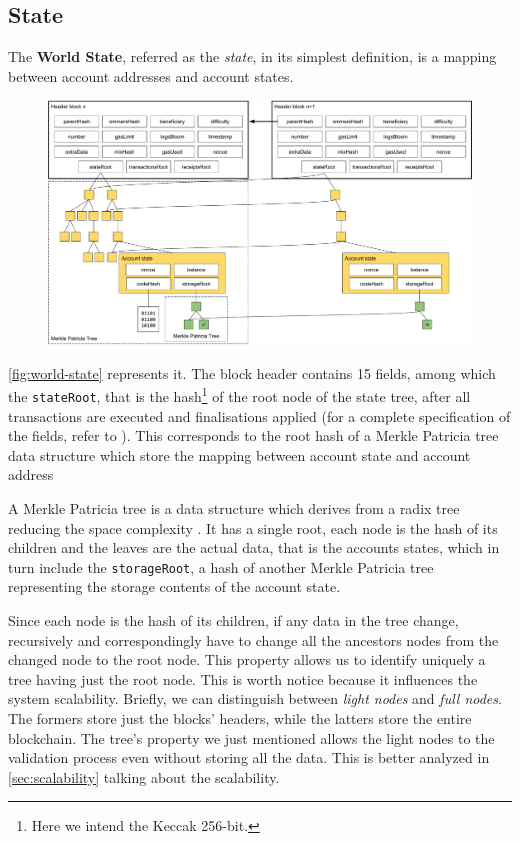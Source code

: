 \subsection{State}

The \textbf{World State}, referred as the \emph{state}, in its simplest
definition, is a mapping between account addresses and account states.

\begin{figure}[h]
  \centering
  \includegraphics[width=\textwidth]{./res/img/world-state.pdf}
\label{fig:world-state}
\end{figure}

\autoref{fig:world-state} represents it. The block header contains 15 fields,
among which the \verb+stateRoot+, that is the hash\footnote{Here we intend the
Keccak 256-bit.} of the root node of the state tree, after all transactions are
executed and finalisations applied (for a complete specification of the fields,
refer to \cite{wood2018ethereum}). This corresponds to the root hash of a Merkle
Patricia tree data structure which store the mapping between account state and
account address

A Merkle Patricia tree is a data structure which derives from a radix tree
reducing the space complexity \cite{patriciatree}. It has a single root, each
node is the hash of its children and the leaves are the actual data, that is the
accounts states, which in turn include the \verb+storageRoot+, a hash of another
Merkle Patricia tree representing the storage contents of the account state.

Since each node is the hash of its children, if any data in the tree change,
recursively and correspondingly have to change all the ancestors nodes from the
changed node to the root node. This property allows us to identify uniquely a
tree having just the root node. This is worth notice because it influences
the system scalability. Briefly, we can distinguish between \emph{light nodes}
and \emph{full nodes}. The formers store just the blocks' headers, while the
latters store the entire blockchain. The tree's property we just mentioned
allows the light nodes to the validation process even without storing all the
data. This is better analyzed in \autoref{sec:scalability} talking about the
scalability.

